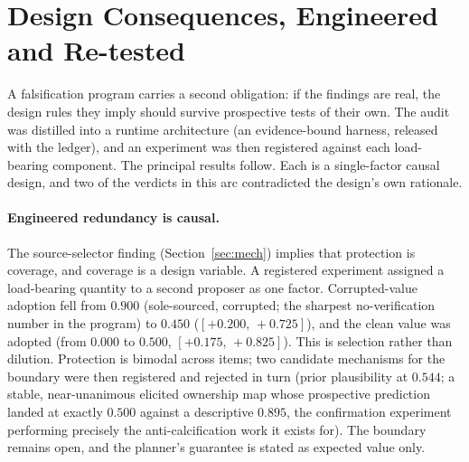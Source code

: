 \documentclass[11pt]{article}
\newcommand{\ci}[2]{\ensuremath{[#1,\,#2]}}
\begin{document}
\section{Design Consequences, Engineered and Re-tested}
\label{sec:harness}

A falsification program carries a second obligation: if the findings
are real, the design rules they imply should survive prospective tests
of their own. The audit was distilled into a runtime architecture (an
evidence-bound harness, released with the ledger), and an experiment
was then registered against each load-bearing component. The principal
results follow. Each is a single-factor causal design, and two of the
verdicts in this arc contradicted the design's own rationale.

\paragraph{Engineered redundancy is causal.} The source-selector
finding (Section~\ref{sec:mech}) implies that protection is coverage,
and coverage is a design variable. A registered experiment assigned a
load-bearing quantity to a second proposer as one factor.
Corrupted-value adoption fell from $0.900$ (sole-sourced, corrupted;
the sharpest no-verification number in the program) to $0.450$
(\ci{+0.200}{+0.725}), and the clean value was adopted (from $0.000$ to
$0.500$, \ci{+0.175}{+0.825}). This is selection rather than dilution.
Protection is bimodal across items; two candidate mechanisms for the
boundary were then registered and rejected in turn (prior plausibility
at $0.544$; a stable, near-unanimous elicited ownership map whose
prospective prediction landed at exactly $0.500$ against a descriptive
$0.895$, the confirmation experiment performing precisely the
anti-calcification work it exists for). The boundary remains open, and
the planner's guarantee is stated as expected value only.
\end{document}
